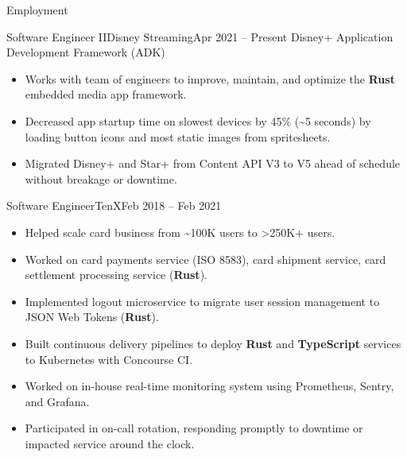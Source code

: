 \documentclass[]{mcdowellcv}
\begin{document}
    \makeheader
    
    \begin{cvsection}{Employment}
        \begin{cvsubsection}{Software Engineer II}{Disney Streaming}{Apr 2021 -- Present}
            Disney+ Application Development Framework (ADK)
            \begin{itemize}
                \item Works with team of engineers to improve, maintain, and optimize the \textbf{Rust} embedded media app framework.
                \item Decreased app startup time on slowest devices by 45\% (\sim5 seconds) by loading button icons and most static images from spritesheets.
                \item Migrated Disney+ and Star+ from Content API V3 to V5 ahead of schedule without breakage or downtime.
            \end{itemize}
        \end{cvsubsection}
        
        \begin{cvsubsection}{Software Engineer}{TenX}{Feb 2018 -- Feb 2021}
            \begin{itemize}
                \item Helped scale card business from \sim100K users to >250K+ users.
                \item Worked on card payments service (ISO 8583), card shipment service, card settlement processing service (\textbf{Rust}).
                \item Implemented logout microservice to migrate user session management to JSON Web Tokens (\textbf{Rust}).
                \item Built continuous delivery pipelines to deploy \textbf{Rust} and \textbf{TypeScript} services to Kubernetes with Concourse CI.
                \item Worked on in-house real-time monitoring system using Prometheus, Sentry, and Grafana.
                \item Participated in on-call rotation, responding promptly to downtime or impacted service around the clock.
            \end{itemize}
        \end{cvsubsection}


\end{cvsection}
\end{document}
